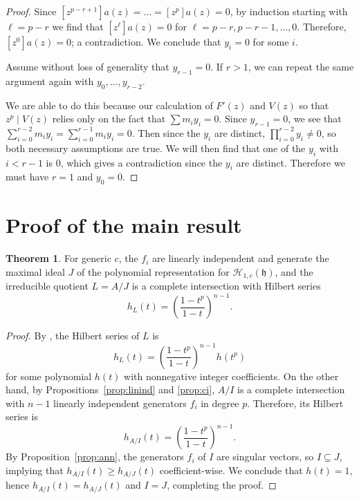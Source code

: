 \documentclass{amsart}
\numberwithin{equation}{section}
\theoremstyle{definition}
\newtheorem{theorem}{Theorem}[section]
\newcommand{\h}{\mathfrak{h}}
\newcommand{\HH}{\mathcal{H}}
\begin{document}
\begin{proof}
Since $[z^{p-r+1}]a(z)=\dots=[z^p]a(z)=0$, by induction starting with $\ell=p-r$ we find that $[z^\ell]a(z)=0$ for $\ell=p-r,p-r-1,\dots,0$. Therefore, $[z^0]a(z)=0$; a contradiction. We conclude that $y_i=0$ for some $i$.

Assume without loss of generality that $y_{r-1}=0$. If $r>1$, we can repeat the same argument again with $y_0,\dots,y_{r-2}$. 

We are able to do this because our calculation of $F'(z)$ and $V(z)$ so that $z^p \mid V(z)$ relies only on the fact that $\sum m_iy_i=0$. Since $y_{r-1}=0$, we see that $\sum_{i=0}^{r-2}m_iy_i=\sum_{i=0}^{r-1}m_iy_i=0$. Then since the $y_i$ are distinct, $\prod_{i=0}^{r-2} y_i \ne 0$, so both necessary assumptions are true. We will then find that one of the $y_i$ with $i < r-1$ is $0$, which gives a contradiction since the $y_i$ are distinct. Therefore we must have $r=1$ and $y_0=0$. 
\end{proof}

\section{Proof of the main result}

\begin{theorem}\label{thm:main}
For generic $c$, the $f_i$ are linearly independent and generate the maximal ideal $J$ of the polynomial representation for $\HH_{1, c}(\h)$, and the irreducible quotient $L = A/J$ is a complete intersection with Hilbert series 
\[
h_L(t) = \left(\frac{1-t^p}{1-t}\right)^{n-1}.
\]
\end{theorem}
\begin{proof}
By \cite[Proposition 3.4]{BC1}, the Hilbert series of $L$ is 
\[
h_L(t) = \left(\frac{1-t^p}{1-t}\right)^{n-1}h(t^p)
\]
for some polynomial $h(t)$ with nonnegative integer coefficients.  On the other hand, by Propositions~\ref{prop:linind} and \ref{prop:ci}, $A/I$ is a complete intersection with $n-1$ linearly independent generators $f_i$ in degree $p$.  Therefore, its Hilbert series is 
\[
h_{A/I}(t)=\left(\frac{1-t^p}{1-t}\right)^{n-1}.
\]
By Proposition~\ref{prop:ann}, the generators $f_i$ of $I$ are singular vectors, so $I \subseteq J$, implying that $h_{A/I}(t) \ge h_{A/J}(t)$ coefficient-wise.  We conclude that $h(t) = 1$, hence $h_{A/I}(t)=h_{A/J}(t)$ and $I=J$, completing the proof.
\end{proof}



\end{document}
